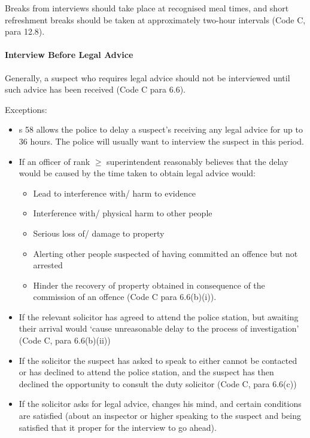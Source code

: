 \documentclass[
]{article}
\providecommand{\tightlist}{%
  \setlength{\itemsep}{0pt}\setlength{\parskip}{0pt}}
\begin{document}
Breaks from interviews should take place at recognised meal times, and
short refreshment breaks should be taken at approximately two-hour
intervals (Code C, para 12.8).

\hypertarget{interview-before-legal-advice}{%
\paragraph{Interview Before Legal
Advice}\label{interview-before-legal-advice}}

Generally, a suspect who requires legal advice should not be interviewed
until such advice has been received (Code C para 6.6).

Exceptions:

\begin{itemize}
\tightlist
\item
  s 58 allows the police to delay a suspect's receiving any legal advice
  for up to 36 hours. The police will usually want to interview the
  suspect in this period.
\item
  If an officer of rank \(\geq\) superintendent reasonably believes that
  the delay would be caused by the time taken to obtain legal advice
  would:

  \begin{itemize}
  \tightlist
  \item
    Lead to interference with/ harm to evidence
  \item
    Interference with/ physical harm to other people
  \item
    Serious loss of/ damage to property
  \item
    Alerting other people suspected of having committed an offence but
    not arrested
  \item
    Hinder the recovery of property obtained in consequence of the
    commission of an offence (Code C para 6.6(b)(i)).
  \end{itemize}
\item
  If the relevant solicitor has agreed to attend the police station, but
  awaiting their arrival would `cause unreasonable delay to the process
  of investigation' (Code C, para 6.6(b)(ii))
\item
  If the solicitor the suspect has asked to speak to either cannot be
  contacted or has declined to attend the police station, and the
  suspect has then declined the opportunity to consult the duty
  solicitor (Code C, para 6.6(c))
\item
  If the solicitor asks for legal advice, changes his mind, and certain
  conditions are satisfied (about an inspector or higher speaking to the
  suspect and being satisfied that it proper for the interview to go
  ahead).
\end{itemize}
\end{document}
